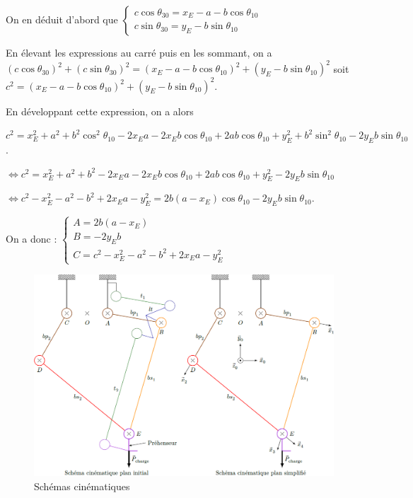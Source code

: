 \documentclass[10pt,fleqn]{article} %
\begin{document}
\ifprof
\begin{corrige}
On en déduit d'abord que  
$
\left\{\begin{array}{l}
c\cos\theta_{30} = x_E - a-b\cos\theta_{10}\\
c\sin\theta_{30} = y_E -    b\sin\theta_{10}  
\end{array} \right.$

En élevant les expressions au carré puis en les sommant, on a 
$\left( c\cos\theta_{30} \right)^2 +\left( c\sin\theta_{30} \right)^2 =
\left(x_E - a-b\cos\theta_{10} \right)^2 + \left( y_E -    b\sin\theta_{10}\right)^2 $
soit 
$ c^2 = \left(x_E - a-b\cos\theta_{10} \right)^2 + \left( y_E -    b\sin\theta_{10}\right)^2 $.

En développant cette expression, on a alors 

$ c^2 = x_E^2 + a^2+b^2\cos^2\theta_{10}  
-2x_Ea- 2x_Eb\cos\theta_{10} + 2ab\cos\theta_{10}
+  y_E^2 +    b^2\sin^2\theta_{10} 
-2y_E   b\sin\theta_{10} $.

$\Longleftrightarrow c^2 = x_E^2 + a^2+b^2 -2x_Ea- 2x_Eb\cos\theta_{10} + 2ab\cos\theta_{10} +  y_E^2   -2y_E   b\sin\theta_{10} $

$\Longleftrightarrow c^2 - x_E^2 - a^2-b^2 +2x_Ea - y_E^2 = 2b\left(a- x_E\right) \cos\theta_{10}   -2y_E   b\sin\theta_{10} $.


On a donc :
$\left\{
\begin{array}{l}
A = 2b\left(a- x_E\right) \\
B =-2y_E   b \\
C = c^2 - x_E^2 - a^2-b^2 +2x_Ea - y_E^2 
\end{array}
\right.$


\end{corrige}
\else
\fi

\ifprof
\else

\begin{figure}[H]
\centering
\includegraphics[width=\linewidth]{fig_03}
\caption{Schémas cinématiques \label{fig_03}}
\end{figure}
\end{document}

